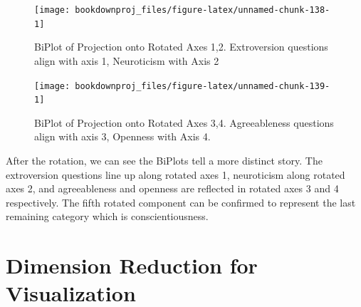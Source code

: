 \documentclass[
]{article}
\newenvironment{Shaded}{\begin{snugshade}}{\end{snugshade}}
\newcommand{\AttributeTok}[1]{\textcolor[rgb]{0.77,0.63,0.00}{#1}}
\newcommand{\DecValTok}[1]{\textcolor[rgb]{0.00,0.00,0.81}{#1}}
\newcommand{\FloatTok}[1]{\textcolor[rgb]{0.00,0.00,0.81}{#1}}
\newcommand{\FunctionTok}[1]{\textcolor[rgb]{0.00,0.00,0.00}{#1}}
\newcommand{\NormalTok}[1]{#1}
\newcommand{\SpecialCharTok}[1]{\textcolor[rgb]{0.00,0.00,0.00}{#1}}
\newcommand{\StringTok}[1]{\textcolor[rgb]{0.31,0.60,0.02}{#1}}
\theoremstyle{definition}
\theoremstyle{definition}
\theoremstyle{definition}
\theoremstyle{definition}
\theoremstyle{remark}
\begin{document}
\begin{figure}

{\centering \texttt{[image: bookdownproj\_files/figure-latex/unnamed-chunk-138-1]} 

}

\caption{BiPlot of Projection onto Rotated Axes 1,2. Extroversion questions align with axis 1, Neuroticism with Axis 2}\label{fig:unnamed-chunk-138}
\end{figure}

\begin{Shaded}
\end{Shaded}

\begin{figure}

{\centering \texttt{[image: bookdownproj\_files/figure-latex/unnamed-chunk-139-1]} 

}

\caption{BiPlot of Projection onto Rotated Axes 3,4. Agreeableness questions align with axis 3, Openness with Axis 4.}\label{fig:unnamed-chunk-139}
\end{figure}

After the rotation, we can see the BiPlots tell a more distinct story. The extroversion questions line up along rotated axes 1, neuroticism along rotated axes 2, and agreeableness and openness are reflected in rotated axes 3 and 4 respectively. The fifth rotated component can be confirmed to represent the last remaining category which is conscientiousness.

\hypertarget{otherdimred}{%
\section{Dimension Reduction for Visualization}\label{otherdimred}}
\end{document}
